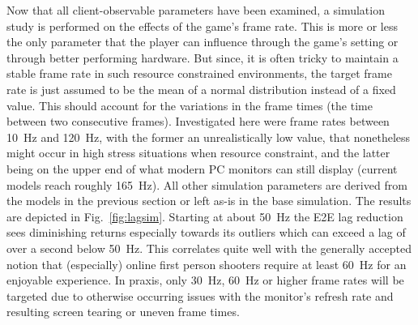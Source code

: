Now that all client-observable parameters have been examined, a simulation study is performed on the effects of the game's frame rate. This is more or less the only parameter that the player can influence through the game's setting or through better performing hardware. But since, it is often tricky to maintain a stable frame rate in such resource constrained environments, the target frame rate is just assumed to be the mean of a normal distribution instead of a fixed value. This should account for the variations in the frame times (the time between two consecutive frames). Investigated here were frame rates between \SI{10}{\hertz} and \SI{120}{\hertz}, with the former an unrealistically low value, that nonetheless might occur in high stress situations when resource constraint, and the latter being on the upper end of what modern PC monitors can still display (current models reach roughly \SI{165}{\hertz}). All other simulation parameters are derived from the models in the previous section or left as-is in the base simulation. The results are depicted in Fig.~\ref{fig:lagsim}. Starting at about \SI{50}{\hertz} the \gls{E2E} lag reduction sees diminishing returns especially towards its outliers which can exceed a lag of over a second below \SI{50}{\hertz}. This correlates quite well with the generally accepted notion that (especially) online first person shooters require at least \SI{60}{\hertz} for an enjoyable experience. In praxis, only \SI{30}{\hertz}, \SI{60}{\hertz} or higher frame rates will be targeted due to otherwise occurring issues with the monitor's refresh rate and resulting screen tearing or uneven frame times.






